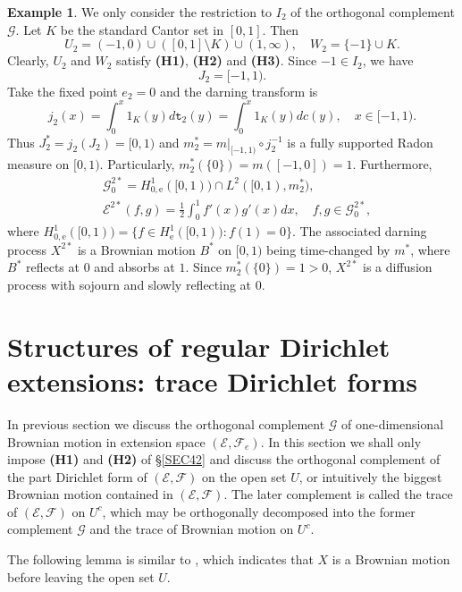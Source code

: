 \documentclass[a4paper]{amsart}
\theoremstyle{definition}
\newtheorem{example}[theorem]{Example}
\theoremstyle{remark}
\numberwithin{equation}{section}
\begin{document}
{\begin{example}
We only consider the restriction to $I_2$ of the orthogonal complement $\mathcal{G}$. Let $K$ be the standard Cantor set in $[0,1]$. Then
\[
	U_2=(-1,0) \cup \left([0,1]\setminus K \right) \cup (1,\infty),\quad
	W_2=\{-1\}\cup K.
\]
Clearly, $U_2$ and $W_2$ satisfy \textbf{(H1)}, \textbf{(H2)} and \textbf{(H3)}.
Since $-1\in I_2$, we have
\[
	J_2=[-1, 1).
\]
Take the fixed point $e_2=0$ and the darning transform is
\[
	j_2(x)=\int_0^x1_{K}(y)d{{\mathtt{t}}}_2(y)=\int_0^x1_K(y)dc(y),\quad x\in [-1,1).
\]
Thus $J^*_2=j_2(J_2)=[0, 1)$ and $m_2^*=m|_{[-1,1)}\circ j_2^{-1}$ is a fully supported Radon measure on $[0,1)$. Particularly, $m_2^*(\{0\})=m([-1,0])=1$. Furthermore,
\[
\begin{aligned}
&\mathcal{G}^{2*}_0=H^1_{0,\mathrm{e}}([0,1))\cap L^2([0,1), m_2^*),\\
&{{\mathcal{E}}}^{2*}(f,g)=\frac{1}{2}\int_0^1 f'(x)g'(x)dx,\quad f,g\in \mathcal{G}^{2*}_0,
\end{aligned}
\]
where $H^1_{0,\mathrm{e}}([0,1))=\{f\in H^1_\mathrm{e}([0,1)): f(1)=0  \}$. The associated darning process $X^{2*}$ is a Brownian motion $B^*$ on $[0,1)$ being time-changed by $m^*$, where $B^*$ reflects at $0$ and absorbs at $1$. Since $m_2^*(\{0\})=1>0$, $X^{2*}$ is a diffusion process with sojourn and slowly reflecting at $0$.
\end{example}
}

\section{{Structures of regular Dirichlet extensions: trace Dirichlet forms}}\label{SEC5}

In previous section we discuss the orthogonal complement $\mathcal{G}$ of one-dimensional Brownian motion in
extension space $({{\mathcal{E}}},{{\mathcal{F}}}_e)$. In this section we shall {only impose \textbf{(H1)} and \textbf{(H2)} of \S\ref{SEC42} and} discuss the orthogonal complement of the part Dirichlet form of $({{\mathcal{E}}},{{\mathcal{F}}})$
on the open set $U$, or intuitively the biggest Brownian motion contained in $({{\mathcal{E}}},{{\mathcal{F}}})$. The later complement is
called the trace of $({{\mathcal{E}}},{{\mathcal{F}}})$ on $U^c$, which may be orthogonally decomposed into the former complement $\mathcal{G}$ and
the trace of Brownian motion on $U^c$.

The following lemma is similar to \cite[Lemma~2.2]{LY14},
which indicates that $X$ is a Brownian motion before leaving the open set $U$.
\end{document}
